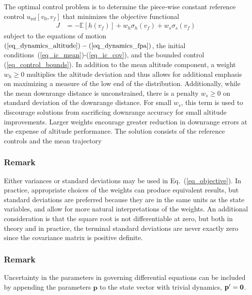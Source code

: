 \documentclass[journal ]{new-aiaa}
\newcommand{\state}{\ensuremath{\mathbf{x}}}
\newcommand{\ur}{\ensuremath{u_{\mathrm{ref}}}}
\newcommand{\param}{\ensuremath{\mathbf{p}}}
\newcommand{\E}[1]{\mathbb{E}\left[#1\right]}
\newcommand{\V}[1]{\mathbb{V}[#1]}
\newcommand{\cov}{C}
\begin{document}
The optimal control problem is to determine the piece-wise constant reference control $\ur\left[v_0,v_f\right]$ that minimizes the objective functional
\begin{align}
J &= -\E{h(v_f)} + w_h\sigma_h(v_f) + w_s\sigma_s(v_f) \label{eq_objective}
\end{align}
subject to the equations of motion $(\ref{eq_dynamics_altitude})-(\ref{eq_dynamics_fpa})$, the initial conditions~(\ref{eq_ic_mean})-(\ref{eq_ic_cov}), and the bounded control (\ref{eq_control_bounds}). 
In addition to the mean altitude component, a weight $w_h\ge0$ multiplies the altitude deviation and thus allows for additional emphasis on maximizing a measure of the low end of the distribution. Additionally, while the mean downrange distance is unconstrained, there is a penalty $w_s\ge0$ on standard deviation of the downrange distance. For small $w_s$, this term is used to discourage solutions from sacrificing downrange accuracy for small altitude improvements. Larger weights encourage greater reduction in downrange errors at the expense of altitude performance. The solution consists of the reference controls and the mean trajectory

\subsubsection*{Remark} Either variances or standard deviations may be used in Eq.~(\ref{eq_objective}). In practice, appropriate choices of the weights can produce equivalent results, but standard deviations are preferred because they are in the same units as the state variables, and allow for more natural interpretations of the weights. An additional consideration is that the square root is not differentiable at zero, but both in theory and in practice, the terminal standard deviations are never exactly zero since the covariance matrix is positive definite.
\subsubsection*{Remark} Uncertainty in the parameters in governing differential equations can be included by appending the parameters $\param$ to the state vector with trivial dynamics, $\param'=\bf0$.
\end{document}
